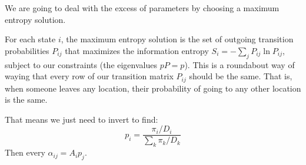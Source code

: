 \documentclass{article}
\begin{document}
We are going to deal with the excess of parameters by choosing a maximum entropy solution.

For each state $i$, the maximum entropy solution is the set of outgoing transition probabilities $P_{ij}$ that maximizes the information entropy $S_i=-\sum_{j}P_{ij}\ln P_{ij}$, subject to our constraints (the eigenvalues $pP=p$). This is a roundabout way of waying that every row of our transition matrix $P_{ij}$ should be the same. That is, when someone leaves any location, their probability of going to any other location is the same.

That means we just need to invert to find:
\begin{equation}
  p_i=\frac{\pi_i/D_i}{\sum_k \pi_k/D_k}
\end{equation}
Then every $\alpha_{ij}=A_ip_j$.
\end{document}
